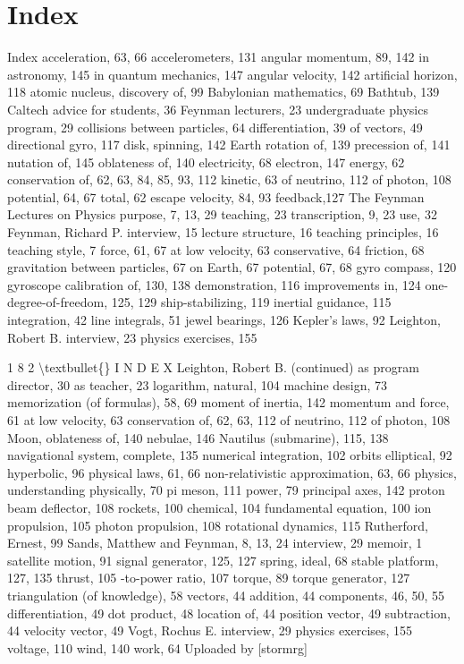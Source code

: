 \documentclass[10pt,oneside]{article}
\begin{document}
\section*{Index}
\label{tips-sec-15-index}
Index acceleration, 63, 66 accelerometers, 131 angular momentum, 89, 142 in astronomy, 145 in quantum mechanics, 147 angular velocity, 142 artificial horizon, 118 atomic nucleus, discovery of, 99 Babylonian mathematics, 69 Bathtub, 139 Caltech advice for students, 36 Feynman lecturers, 23 undergraduate physics program, 29 collisions between particles, 64 differentiation, 39 of vectors, 49 directional gyro, 117 disk, spinning, 142 Earth rotation of, 139 precession of, 141 nutation of, 145 oblateness of, 140 electricity, 68 electron, 147 energy, 62 conservation of, 62, 63, 84, 85, 93, 112 kinetic, 63 of neutrino, 112 of photon, 108 potential, 64, 67 total, 62 escape velocity, 84, 93 feedback,127 The Feynman Lectures on Physics purpose, 7, 13, 29 teaching, 23 transcription, 9, 23 use, 32 Feynman, Richard P. interview, 15 lecture structure, 16 teaching principles, 16 teaching style, 7 force, 61, 67 at low velocity, 63 conservative, 64 friction, 68 gravitation between particles, 67 on Earth, 67 potential, 67, 68 gyro compass, 120 gyroscope calibration of, 130, 138 demonstration, 116 improvements in, 124 one-degree-of-freedom, 125, 129 ship-stabilizing, 119 inertial guidance, 115 integration, 42 line integrals, 51 jewel bearings, 126 Kepler’s laws, 92 Leighton, Robert B. interview, 23 physics exercises, 155\par

1 8 2 \textbackslash{}textbullet\{\} I N D E X Leighton, Robert B. (continued) as program director, 30 as teacher, 23 logarithm, natural, 104 machine design, 73 memorization (of formulas), 58, 69 moment of inertia, 142 momentum and force, 61 at low velocity, 63 conservation of, 62, 63, 112 of neutrino, 112 of photon, 108 Moon, oblateness of, 140 nebulae, 146 Nautilus (submarine), 115, 138 navigational system, complete, 135 numerical integration, 102 orbits elliptical, 92 hyperbolic, 96 physical laws, 61, 66 non-relativistic approximation, 63, 66 physics, understanding physically, 70 pi meson, 111 power, 79 principal axes, 142 proton beam deflector, 108 rockets, 100 chemical, 104 fundamental equation, 100 ion propulsion, 105 photon propulsion, 108 rotational dynamics, 115 Rutherford, Ernest, 99 Sands, Matthew and Feynman, 8, 13, 24 interview, 29 memoir, 1 satellite motion, 91 signal generator, 125, 127 spring, ideal, 68 stable platform, 127, 135 thrust, 105 -to-power ratio, 107 torque, 89 torque generator, 127 triangulation (of knowledge), 58 vectors, 44 addition, 44 components, 46, 50, 55 differentiation, 49 dot product, 48 location of, 44 position vector, 49 subtraction, 44 velocity vector, 49 Vogt, Rochus E. interview, 29 physics exercises, 155 voltage, 110 wind, 140 work, 64 Uploaded by [stormrg]\par
\end{document}
